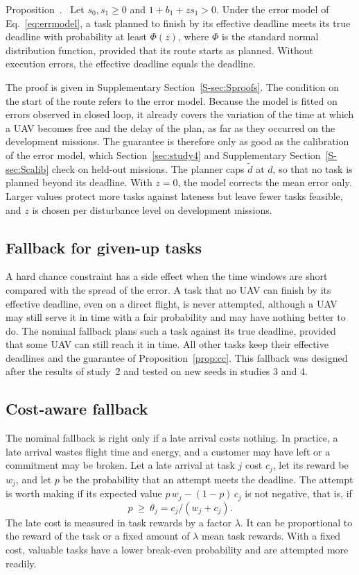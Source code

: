 \documentclass[a4paper,fleqn]{cas-dc}
\newcounter{prop}
\newenvironment{prop}{\par\smallskip\refstepcounter{prop}\noindent Proposition~\theprop.\ }{\par\smallskip}
\begin{document}
\begin{prop}\label{prop:cc}
Let $s_0,s_1\ge0$ and $1+b_1+zs_1>0$. Under the error model of Eq.~\eqref{eq:errmodel}, a task planned to finish by its
effective deadline meets its true deadline with probability at least $\Phi(z)$, where $\Phi$ is the standard normal
distribution function, provided that its route starts as planned. Without execution errors, the effective deadline
equals the deadline.
\end{prop}

The proof is given in Supplementary Section~\ref{S-sec:Sproofs}. The condition on the start of the route refers to the
error model. Because the model is fitted on errors observed in closed loop, it already covers the variation of the time
at which a UAV becomes free and the delay of the plan, as far as they occurred on the development missions. The
guarantee is therefore only as good as the calibration of the error model, which Section~\ref{sec:study4} and Supplementary Section~\ref{S-sec:Scalib} check on held-out
missions. The planner caps $\tilde d$ at $d$, so that no task is planned beyond its deadline. With $z=0$, the model
corrects the mean error only. Larger values protect more tasks against lateness but leave fewer tasks feasible, and $z$
is chosen per disturbance level on development missions.

\subsection{Fallback for given-up tasks}\label{sec:fallback}
A hard chance constraint has a side effect when the time windows are short compared with the spread of the error. A
task that no UAV can finish by its effective deadline, even on a direct flight, is never attempted, although a UAV may
still serve it in time with a fair probability and may have nothing better to do. The nominal fallback plans such a
task against its true deadline, provided that some UAV can still reach it in time. All other tasks keep their effective
deadlines and the guarantee of Proposition~\ref{prop:cc}. This fallback was designed after the results of study~2 and
tested on new seeds in studies 3 and 4.

\subsection{Cost-aware fallback}\label{sec:costfb}
The nominal fallback is right only if a late arrival costs nothing. In practice, a late arrival wastes flight time and
energy, and a customer may have left or a commitment may be broken. Let a late arrival at task $j$ cost $c_j$, let its
reward be $w_j$, and let $p$ be the probability that an attempt meets the deadline. The attempt is worth making if its
expected value $p\,w_j-(1-p)\,c_j$ is not negative, that is, if
\begin{equation}\label{eq:theta}
p\ \ge\ \theta_j=c_j/(w_j+c_j).
\end{equation}
The late cost is measured in task rewards by a factor $\lambda$. It can be proportional to the reward of the task or a
fixed amount of $\lambda$ mean task rewards. With a fixed cost, valuable tasks have a lower break-even probability and
are attempted more readily.
\end{document}
